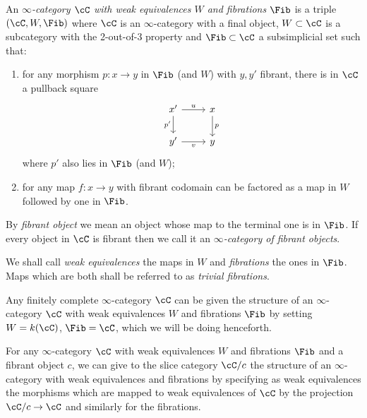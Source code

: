 \begin{defn}\label{fibicat}
  An \emph{$\infty$-category $\cC$ with weak equivalences $W$ and fibrations $\Fib$} is a
  triple
  $(\cC,W,\Fib)$ where $\cC$ is an $\infty$-category with a final object,
  $W\subset\cC$ is a subcategory with the 2-out-of-3 property and
  $\Fib\subset\cC$ a subsimplicial set such that:
  \begin{enumerate}
    \item for any morphism $p\colon x\rightarrow y$ in $\Fib$ (and $W$) with
      $y,y'$ fibrant, there is in $\cC$ a pullback square
      \[\begin{tikzcd}
        {x'} & x \\
        {y'} & y
        \arrow["p", from=1-2, to=2-2]
        \arrow["{p'}"', from=1-1, to=2-1]
        \arrow["v"', from=2-1, to=2-2]
        \arrow["u", from=1-1, to=1-2]
      \end{tikzcd}\]
      where $p'$ also lies in $\Fib$ (and $W$);
    \item for any map $f\colon x\rightarrow y$ with fibrant codomain can be
      factored as a map in $W$ followed by one in $\Fib$.
  \end{enumerate}
  By \emph{fibrant object} we mean an object whose map to the terminal one is in
  $\Fib$. If every object in $\cC$ is fibrant then we call it an
  \emph{$\infty$-category of fibrant objects}.

  We shall call \emph{weak equivalences} the maps in $W$ and \emph{fibrations}
  the ones in $\Fib$. Maps which are both shall be referred to as \emph{trivial
  fibrations}.
\end{defn}

\begin{construction}\label{fincomplarefib}
  Any finitely complete $\infty$-category $\cC$ can be given the structure of an
  $\infty$-category $\cC$ with weak equivalences $W$ and fibrations $\Fib$ by setting $W=k(\cC)$,
  $\Fib=\cC$, which we will be doing henceforth.
\end{construction}

\begin{construction}
  For any $\infty$-category $\cC$ with weak equivalences $W$ and fibrations $\Fib$ and a
  fibrant object $c$, we can give to the slice category $\cC/c$ the structure of an
  $\infty$-category with weak equivalences and fibrations by specifying as weak
  equivalences the morphisms which are mapped to weak equivalences of $\cC$ by
  the projection $\cC/c\rightarrow\cC$ and similarly for the fibrations.
\end{construction}

